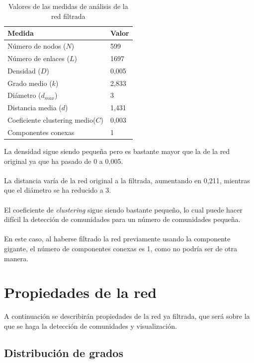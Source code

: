 \begin{table}[H]
	\centering
	\caption{Valores de las medidas de análisis de la red filtrada}
	\label{tab:medidas-filtrada}
	\begin{tabular}{| l | l |}
		\hline
		Medida                							& Valor          \\ 
		\hline
		Número de nodos ($N$)           					& 599           \\
		Número de enlaces ($L$)                   		& 1697           \\
		Densidad ($D$)                   				& 0,005         \\
		Grado medio ($k$)                   				& 2,833          \\
		Diámetro ($d_{max}$)             				& 3              \\
		Distancia media ($d$)                   			& 1,431          \\
		Coeficiente clustering medio($C$)               & 0,003             \\
		Componentes conexas   					   		& 1            \\ 
		\hline
	\end{tabular}
\end{table}

La densidad sigue siendo pequeña pero es bastante mayor que la de la red original ya que ha pasado de 0 a 0,005.
\\ \\
La distancia varía de la red original a la filtrada, aumentando en 0,211, mientras que el diámetro se ha reducido a 3.
\\ \\
El coeficiente de \textit{clustering} sigue siendo bastante pequeño, lo cual puede hacer difícil la detección de comunidades para un número de comunidades pequeña.
\\ \\
En este caso, al haberse filtrado la red previamente usando la componente gigante, el número de componentes conexas es 1, como no podría ser de otra manera.

\section{Propiedades de la red}

A continuación se describirán propiedades de la red ya filtrada, que será sobre la que se haga la detección de comunidades y visualización.

\subsection{Distribución de grados}


